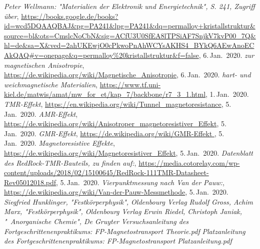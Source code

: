 \documentclass[german,  %
parskip=full,  %
]{scrartcl}
\begin{document}
   \begin{thebibliography}{9}
   \emph{Peter Wellmann: "Materialien der Elektronik und Energietechnik", S. 241, Zugriff über},
    \url{https://books.google.de/books?id=wcd5DQAAQBAJ&pg=PA241&lpg=PA241&dq=permalloy+kristallstruktur&source=bl&ots=CmslcNoCbN&sig=ACfU3U0SfEA8lTPSiAF7SnjkV7kvP00_7Q&hl=de&sa=X&ved=2ahUKEwjO0cPkwoPnAhWCYsAKHS4_BYkQ6AEwAnoECAkQAQ#v=onepage&q=permalloy\%20kristallstruktur&f=false},
   6.\,Jan.~2020.
   \emph{zur magnetischen Anisotropie},
   \url{https://de.wikipedia.org/wiki/Magnetische_Anisotropie},
    6.\,Jan.~2020.
    \emph{hart- und weichmagnetische Materialien},
    \url{https://www.tf.uni-kiel.de/matwis/amat/mw_for_et/kap_7/backbone/r7_3_1.html},
    1.\,Jan.~2020.
    \emph{TMR-Effekt},
    \url{https://en.wikipedia.org/wiki/Tunnel_magnetoresistance},
    5.\,Jan.~2020.
    \emph{AMR-Effekt},
    \url{https://de.wikipedia.org/wiki/Anisotroper_magnetoresistiver_Effekt},
    5.\,Jan.~2020.
    \emph{GMR-Effekt},
    \url{https://de.wikipedia.org/wiki/GMR-Effekt },
    5.\,Jan.~2020.
    \emph{Magnetoresistive Effekte},
    \url{https://de.wikipedia.org/wiki/Magnetoresistiver_Effekt},
    5.\,Jan.~2020.
    \emph{Datenblatt des RedRock-TMR-Bauteils, zu finden auf:},
    \url{https://media.cotorelay.com/wp-content/uploads/2018/02/15100645/RedRock-111TMR-Datasheet-Rev05012018.pdf},
    5.\,Jan.~2020.
    \emph{Vierpunktmessung nach Van der Pauw:},
    \url{https://de.wikipedia.org/wiki/Van-der-Pauw-Messmethode},
    5.\,Jan.~2020.
    \emph{Siegfried Hunklinger, "Festkörperphysik", Oldenbourg Verlag}
    \emph{Rudolf Gross, Achim Marx, "Festkörperphysik", Oldenbourg Verlag}
    \emph{Erwin Riedel, Christoph Janiak, "\ Anorganische Chemie", De Gruyter}
	\emph{Versuchsanleitung des Fortgeschrittenenpraktikums: FP-Magnetostransport Theorie.pdf}
	\emph{Platzanleitung des Fortgeschrittenenpraktikums: FP-Magnetostransport Platzanleitung.pdf}	
\end{thebibliography}    
\end{document}
